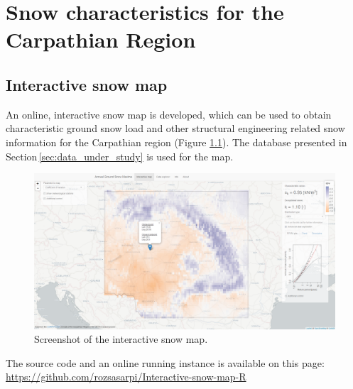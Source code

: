 \chapter{Snow characteristics for the Carpathian Region} 

\ifpdf
    \graphicspath{{Appendix1/Figs/Raster/}{Appendix1/Figs/PDF/}{Appendix1/Figs/}}
\else
    \graphicspath{{Appendix1/Figs/Vector/}{Appendix1/Figs/}}
\fi



\section{Interactive snow map}
\label{sec:int_snow_map}

An online, interactive snow map is developed, which can be used to obtain characteristic ground snow load and other structural engineering related snow information for the Carpathian region (Figure \ref{fig:int_snow_map}). The database presented in Section\,\ref{sec:data_under_study} is used for the map.

\begin{figure}[htbp!]
	\centering    
	\includegraphics[width=1\textwidth]{online_snow_map_illustration.png}
	\caption{Screenshot of the interactive snow map.}
	\label{fig:int_snow_map}
\end{figure}

\noindent
The source code and an online running instance is available on this page:\\
\url{https://github.com/rozsasarpi/Interactive-snow-map-R}

